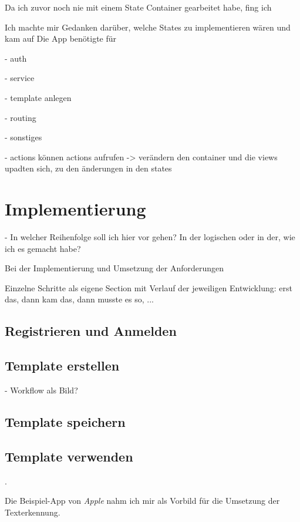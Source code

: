 \documentclass[nomenclature, onesided, 150]{HSMW-Thesis}
\begin{document}
		
			
		Da ich zuvor noch nie mit einem State Container gearbeitet habe, fing ich 
		
		
		
		Ich machte mir Gedanken darüber, welche States zu implementieren wären und kam auf 
		Die App benötigte für 
		
		- auth
		
		- service
		
		- template anlegen
		
		- routing
		
		- sonstiges
		
		- actions können actions aufrufen -> verändern den container und die views upadten sich, zu den änderungen in den states

	\section{Implementierung}
		
		- In welcher Reihenfolge soll ich hier vor gehen? In der logischen oder in der, wie ich es gemacht habe?
		
		Bei der Implementierung und Umsetzung der Anforderungen 
		
		
		
		
		Einzelne Schritte als eigene Section mit Verlauf der jeweiligen Entwicklung: erst das, dann kam das, dann musste es so, ...
		
		\subsection{Registrieren und Anmelden}
			
		\subsection{Template erstellen}
			- Workflow als Bild?
		
		\subsection{Template speichern}
		
		\subsection{Template verwenden}
		
		.
		
		Die Beispiel-App von \textit{Apple} nahm ich mir als Vorbild für die Umsetzung der Texterkennung.
		
\end{document}
